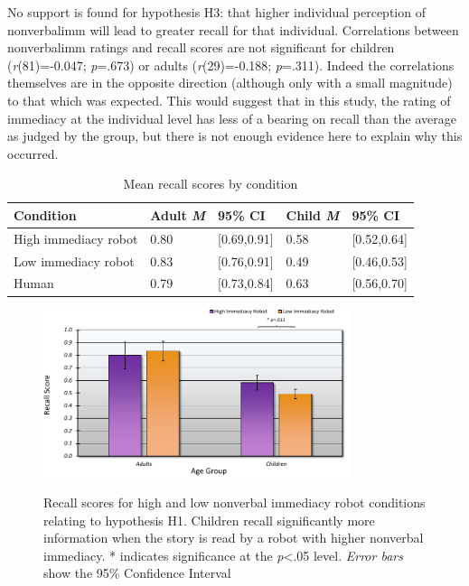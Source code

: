 No support is found for hypothesis H3: that higher individual perception of \gls{nonverbalimm} will lead to greater recall for that individual. Correlations between \gls{nonverbalimm} ratings and recall scores are not significant for children (\textit{r}(81)=-0.047; \textit{p}=.673) or adults (\textit{r}(29)=-0.188; \textit{p}=.311). Indeed the correlations themselves are in the opposite direction (although only with a small magnitude) to that which was expected. This would suggest that in this study, the rating of immediacy at the individual level has less of a bearing on recall than the average as judged by the group, but there is not enough evidence here to explain why this occurred.

\begin{table}[t!]
	\centering
	\renewcommand{\arraystretch}{1.2} 
	\begin{tabular}{@{}lllll@{}}
	\toprule
	\textbf{Condition}		& \textbf{Adult \textit{M}}	& \textbf{95\% CI}	& \textbf{Child \textit{M}} & \textbf{95\% CI}			\\ \midrule
	High immediacy robot	& 0.80      & [0.69,0.91]	& 0.58		& [0.52,0.64]		\\
	Low immediacy robot 	& 0.83 		& [0.76,0.91]	& 0.49		& [0.46,0.53]		\\
	Human					& 0.79		& [0.73,0.84]	& 0.63		& [0.56,0.70]		\\ \bottomrule
	\end{tabular}
	\caption{Mean recall scores by condition}
	\label{table:ch4_recall}
\end{table}

\begin{figure}[t!]
\centering
    \includegraphics[width=0.8\textwidth]{images/ch4_RecallGraph.pdf} \\
   \caption{Recall scores for high and low nonverbal immediacy robot conditions relating to hypothesis H1. Children recall significantly more information when the story is read by a robot with higher nonverbal immediacy. * indicates significance at the \textit{p}\textless .05 level. \textit{Error bars} show the 95\% Confidence Interval}
    \label{fig:ch4_recallgraph}
\end{figure}

